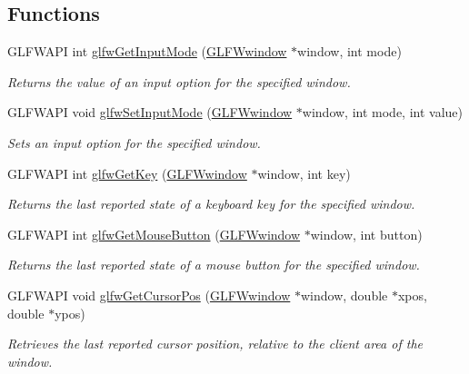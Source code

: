 \subsection*{\-Functions}
\begin{DoxyCompactItemize}
\item 
\-G\-L\-F\-W\-A\-P\-I int \hyperlink{group__input_ga1248dd5b1e566b2817e71547564d6af9}{glfw\-Get\-Input\-Mode} (\hyperlink{group__window_ga3c96d80d363e67d13a41b5d1821f3242}{\-G\-L\-F\-Wwindow} $\ast$window, int mode)
\begin{DoxyCompactList}\small\item\em \-Returns the value of an input option for the specified window. \end{DoxyCompactList}\item 
\-G\-L\-F\-W\-A\-P\-I void \hyperlink{group__input_gae1eb729d2dd91dc33fd60e150a6e1684}{glfw\-Set\-Input\-Mode} (\hyperlink{group__window_ga3c96d80d363e67d13a41b5d1821f3242}{\-G\-L\-F\-Wwindow} $\ast$window, int mode, int value)
\begin{DoxyCompactList}\small\item\em \-Sets an input option for the specified window. \end{DoxyCompactList}\item 
\-G\-L\-F\-W\-A\-P\-I int \hyperlink{group__input_ga7d8ad8ffaf272808f04e1d5d33ec8859}{glfw\-Get\-Key} (\hyperlink{group__window_ga3c96d80d363e67d13a41b5d1821f3242}{\-G\-L\-F\-Wwindow} $\ast$window, int key)
\begin{DoxyCompactList}\small\item\em \-Returns the last reported state of a keyboard key for the specified window. \end{DoxyCompactList}\item 
\-G\-L\-F\-W\-A\-P\-I int \hyperlink{group__input_ga6da5efb04f700c312a57a169fa9393a0}{glfw\-Get\-Mouse\-Button} (\hyperlink{group__window_ga3c96d80d363e67d13a41b5d1821f3242}{\-G\-L\-F\-Wwindow} $\ast$window, int button)
\begin{DoxyCompactList}\small\item\em \-Returns the last reported state of a mouse button for the specified window. \end{DoxyCompactList}\item 
\-G\-L\-F\-W\-A\-P\-I void \hyperlink{group__input_gad289438eb7cf53d11eca685373f44105}{glfw\-Get\-Cursor\-Pos} (\hyperlink{group__window_ga3c96d80d363e67d13a41b5d1821f3242}{\-G\-L\-F\-Wwindow} $\ast$window, double $\ast$xpos, double $\ast$ypos)
\begin{DoxyCompactList}\small\item\em \-Retrieves the last reported cursor position, relative to the client area of the window. \end{DoxyCompactList}\item 

\end{DoxyCompactItemize}
